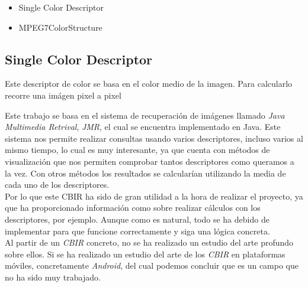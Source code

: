 \begin{itemize}

\item Single Color Descriptor

\item MPEG7ColorStructure

\end{itemize}

\subsection{Single Color Descriptor}

Este descriptor de color se basa en el color medio de la imagen. Para calcularlo recorre una imágen pixel a pixel


Este trabajo se basa en el sistema de recuperación de imágenes llamado \textit{Java Multimedia Retrival}, \textit{JMR}, el cual se encuentra implementado en Java. Este sistema nos permite realizar consultas usando varios descriptores, incluso varios al mismo tiempo, lo cual es muy interesante, ya que cuenta con métodos de visualización que nos permiten comprobar tantos descriptores como queramos a la vez. Con otros métodos los resultados se calcularían utilizando la media de cada uno de los descriptores.\\

Por lo que este CBIR ha sido de gran utilidad a la hora de realizar el proyecto, ya que ha proporcionado información como sobre realizar cálculos con los descriptores, por ejemplo. Aunque como es natural, todo se ha debido de implementar para que funcione correctamente y siga una lógica concreta.\\

Al partir de un \textit{CBIR} concreto, no se ha realizado un estudio del arte profundo sobre ellos. Si se ha realizado un estudio del arte de los \textit{CBIR} en plataformas móviles, concretamente \textit{Android}, del cual podemos concluir que es un campo que no ha sido muy trabajado.






